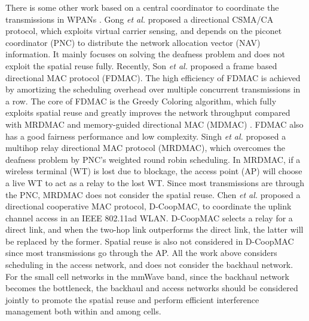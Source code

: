 \documentclass[journal]{IEEEtran}
\begin{document}
There is some other work based on a central coordinator to coordinate the transmissions in WPANs
\cite{MRDMAC, mao, mao_11, chenqian}. Gong \emph{et al.} \cite{mao_11} proposed a directional CSMA/CA
protocol, which exploits virtual carrier sensing, and depends on the piconet coordinator (PNC) to
distribute the network allocation vector (NAV) information. It mainly focuses on solving the
deafness problem and does not exploit the spatial reuse fully. Recently, Son \emph{et al.}
\cite{mao} proposed a frame based directional MAC protocol (FDMAC).
The high efficiency of FDMAC is achieved by amortizing the
scheduling overhead over multiple concurrent transmissions in a row.
The core of FDMAC is the Greedy Coloring algorithm, which fully
exploits spatial reuse and greatly improves the network throughput
compared with MRDMAC \cite{MRDMAC} and memory-guided directional MAC
(MDMAC) \cite{MDMAC}. FDMAC also has a good fairness performance
and low complexity. Singh \emph{et al.} \cite{MRDMAC}
proposed a multihop relay directional MAC protocol (MRDMAC), which overcomes the deafness problem
by PNC's weighted round robin scheduling. In MRDMAC, if a wireless terminal (WT) is lost due to
blockage, the access point (AP) will choose a live WT to act as a relay to the lost WT. Since most
transmissions are through the PNC, MRDMAC does not consider the spatial reuse. Chen \emph{et al.}
\cite{chenqian} proposed a directional cooperative MAC protocol, D-CoopMAC, to coordinate the
uplink channel access in an IEEE 802.11ad WLAN. D-CoopMAC selects a relay for a direct link, and
when the two-hop link outperforms the direct link, the latter will be replaced by the former.
Spatial reuse is also not considered in D-CoopMAC since most transmissions go through the AP. All
the work above considers scheduling in the access network, and does not consider the backhaul
network. For the small cell networks in the mmWave band, since the backhaul network becomes the
bottleneck, the backhaul and access networks should be considered jointly to promote the spatial
reuse and perform efficient interference management both within and among cells.
\end{document}
